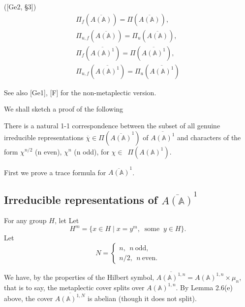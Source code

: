 \begin{lemma} ([Ge2, \S 3])
\[
\begin{array}{c}    
\Pi_f (\overline{A({\mathbb{A}})})=\Pi (\overline{A({\mathbb{A}})}),\\
\Pi_{u,f} (\overline{A({\mathbb{A}})})=\Pi_u (\overline{A({\mathbb{A}})}),\\
\Pi_f (\overline{A({\mathbb{A}})^1})=\Pi (\overline{A({\mathbb{A}})^1}),\\
\Pi_{u,f} (\overline{A({\mathbb{A}})^1})=\Pi_u (\overline{A({\mathbb{A}})^1})
\end{array}
\]
\end{lemma}

See also [Ge1], [F] for the non-metaplectic version.

We shall sketch a proof of the following

\begin{theorem}
There is a natural 1-1 correspondence between the subset of all genuine
irreducible representations
$\overline{\chi }\in \Pi (\overline{A({\mathbb{A}})}^1)$
of $\overline{A({\mathbb{A}})^1}$ and characters of the form
$\chi ^{n/2}$ (n even), $\chi ^n$ (n odd),
for $\chi \in $\ $\Pi (A({\mathbb{A}})^1)$.
\end{theorem}

First we prove a trace formula for $\overline{A({\mathbb{A}})}^1$.

\subsection{Irreducible representations of $\overline{A({\mathbb{A}})}^1$}

For any group $H$, let
Let 
\begin{equation}
H^m
=\{x\in H\;|\;x=y^m,\;\;\mathrm{some}
\;\;y\in H\}.
\end{equation}
Let 
\begin{equation}
N=
\left\{
\begin{array}{c}
n,\ \ n \mathrm{\ odd},\\
n/2,\ \ n \mathrm{\ even}.
\end{array}
\right.
\end{equation}

We have, by the properties of the Hilbert
symbol,
$\overline{A({{\mathbb{A}}})^{1,n}}=A({{\mathbb{A}}})^{1,n}\times \mu _n$,
that is to say, the metaplectic cover
splits over $A({{\mathbb{A}}})^{1,n}$.
By Lemma 2.6(e) above, the cover
$\overline{A({{\mathbb{A}}})^{1,N}}$ is abelian (though it
does not split).

